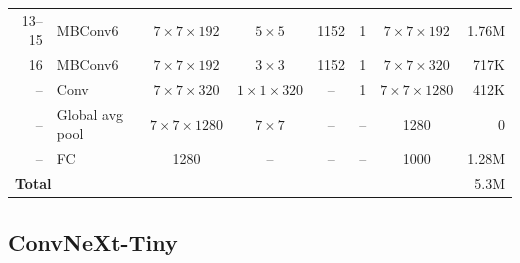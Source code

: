 \begin{table}[!htb]
\begin{tabular}{rlcccccr}
13--15  & MBConv6         & $7\times7\times192$    & $5\times5$          & 1152 & 1  & $7\times7\times192$    & 1.76M \\
16      & MBConv6         & $7\times7\times192$    & $3\times3$          & 1152 & 1  & $7\times7\times320$    & 717K  \\
--      & Conv            & $7\times7\times320$    & $1\times1\times320$ & --   & 1  & $7\times7\times1280$   & 412K  \\
--      & Global avg pool & $7\times7\times1280$   & $7\times7$          & --   & -- & 1280                   & 0     \\
--      & FC              & 1280                   & --                  & --   & -- & 1000                   & 1.28M \\
\midrule
\multicolumn{7}{l}{\textbf{Total}} & 5.3M \\
\bottomrule
\end{tabular}
\end{table}

\FloatBarrier
\subsection{ConvNeXt-Tiny}\label{sec:convnext}

